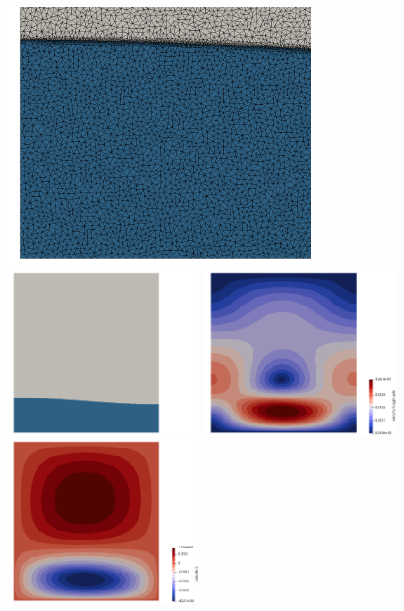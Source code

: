 \begin{center}
\includegraphics[width=9cm]{python_codes/fieldstone_93/results_exp4/grid_zoom}\\
\includegraphics[width=5.7cm]{python_codes/fieldstone_93/results_exp4/grid}
\includegraphics[width=5.7cm]{python_codes/fieldstone_93/results_exp4/vel}
\includegraphics[width=5.7cm]{python_codes/fieldstone_93/results_exp4/u}\\

\end{center}
